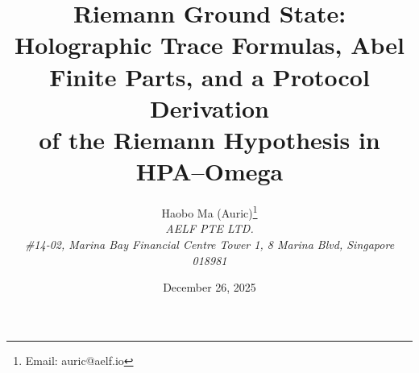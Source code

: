 \documentclass[11pt,a4paper]{article}
\title{Riemann Ground State:\\
Holographic Trace Formulas, Abel Finite Parts, and a Protocol Derivation\\
of the Riemann Hypothesis in HPA--Omega}
\author{Haobo Ma (Auric)\thanks{Email: auric@aelf.io} \\
\textit{AELF PTE LTD.} \\
\textit{\#14-02, Marina Bay Financial Centre Tower 1, 8 Marina Blvd, Singapore 018981}}
\date{December 26, 2025}
\begin{document}
\maketitle












\FloatBarrier
\appendix


\FloatBarrier

\end{document}

